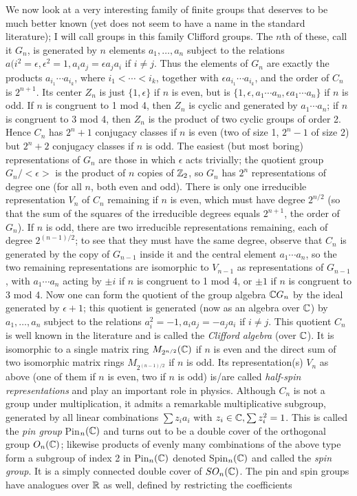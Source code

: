 We now look at a very interesting family of finite groups that deserves to be much better known (yet does not seem to have a name in the standard literature); I will call groups in this family Clifford groups.  The $n$th of these, call it $G_n$, is generated by $n$ elements $a_1,\ldots,a_n$ subject to the relations $a(i^2 = \epsilon,\epsilon^2 = 1, a_i a_j = \epsilon a_j a_i$ if $i\ne j$.  Thus the elements of $G_n$ are exactly the products $a_{i_1}\cdots a_{i_k}$, where $i_1 < \cdots < i_k$, together with
$\epsilon a_{i_1}\cdots a_{i_k}$, and the order of $C_n$ is $2^{n+1}$.  Its center $Z_n$ is just
$\{1,\epsilon\}$ if $n$ is even, but is $\{1,\epsilon,a_1\cdots a_n,\epsilon a_1\cdots a_n\}$ if $n$ is odd.  If $n$ is congruent to 1 mod 4, then $Z_n$ is cyclic and generated by $a_1\cdots a_n$; if $n$ is congruent to 3 mod 4, then $Z_n$ is the product of two cyclic groups of order 2.  Hence $C_n$ has $2^n + 1$ conjugacy classes if $n$ is even (two of size 1, $2^n - 1$ of size 2) but $2^n + 2$ conjugacy classes if $n$ is odd.  The easiest (but most boring) representations of $G_n$ are those in which $\epsilon$ acts trivially; the quotient group $G_n/<\epsilon>$ is the product of $n$ copies of $\Bbb Z_2$, so $G_n$ has $2^n$ representations of degree one (for all $n$, both even and odd).  There is only one irreducible representation $V_n$ of $C_n$ remaining if $n$ is even, which must have degree $2^{n/2}$ (so that the sum of the squares of the irreducible degrees equals $2^{n+1}$, the order of $G_n$).  If $n$ is odd, there are two irreducible representations remaining, each of degree $2^{(n-1)/2}$; to see that they must have the same degree, observe that $C_n$ is generated by the copy of $G_{n-1}$ inside it and the central element $a_1\cdots a_n$, so the two remaining representations are isomorphic to $V_{n-1}$ as representations of $G_{n-1}$, with $a_1\cdots a_n$ acting by $\pm i$ if $n$ is congruent to 1 mod 4, or $\pm 1$ if $n$ is congruent to 3 mod 4.  Now one can form the quotient of the group algebra $\Bbb C G_n$ by the ideal generated by $\epsilon+1$; this quotient is generated (now as an algebra over $\Bbb C$) by $a_1,\ldots,a_n$ subject to the relations $a_i^2 = -1, a_i a_j = - a_j a_i$ if $i\ne j$.  This quotient $C_n$ is well known in the literature and is called the {\sl Clifford algebra} (over $\Bbb C$).  It is isomorphic to a single matrix ring $M_{2^{n/2}}(\Bbb C)$ if $n$ is even and the direct sum of two isomorphic matrix rings $M_{2^{(n-1)/2}}$ if $n$ is odd.  Its representation(s) $V_n$ as above (one of them if $n$ is even, two if $n$ is odd) is/are called {\sl half-spin representations} and play an important role in physics.  Although $C_n$ is not a group under multiplication, it admits a remarkable multiplicative subgroup, generated by all linear combinations $\sum z_i a_i$ with $z_i\in\Bbb C,\sum z_i^2 = 1$.  This is called the {\sl pin group} Pin$_n(\Bbb C)$ and turns out to be a double cover of the orthogonal group $O_n(\Bbb C)$; likewise products of evenly many combinations of the above type form a subgroup of index 2 in Pin$_n(\Bbb C)$ denoted Spin$_n(\Bbb C)$ and called the {\sl spin group}.  It is a simply connected double cover of $SO_n(\Bbb C)$.  The pin and spin groups have analogues over $\Bbb R$ as well, defined by restricting the coefficients 